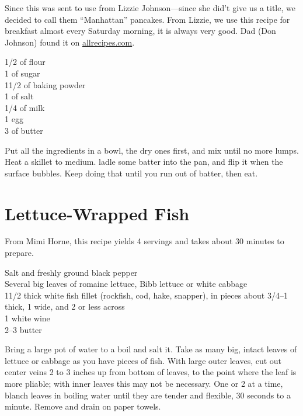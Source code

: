 \begin{open}
    Since this was sent to use from Lizzie Johnson---since she did't give us a title, we decided to call them ``Manhattan'' pancakes.  From Lizzie, we use this recipe for breakfast almost every Saturday morning, it is always very good. Dad (Don Johnson) found it on \url{allrecipes.com}.
\end{open}
\begin{ingredients}
    \SI{1/2}{\cup} of flour\\
    \SI{1}{\tblspoon} of sugar\\
    1\SI{1/2}{\teaspoon} of baking powder\\
    \SI{1}{\teaspoon} of salt\\
    \SI{1/4}{\cup} of milk\\
    1 egg\\
    \SI{3}{\tblspoon} of butter\\
\end{ingredients}
Put all the ingredients in a bowl, the dry ones first, and mix until no more
lumps. Heat a skillet to medium. ladle some batter into the pan, and flip it
when the surface bubbles. Keep doing that until you run out of batter, then eat.

\section{Lettuce-Wrapped Fish}

\begin{open}
    From Mimi Horne, this recipe yields 4 servings and takes about 30 minutes to prepare.
\end{open}
\begin{ingredients}
    Salt and freshly ground black pepper\\
    Several big leaves of romaine lettuce, Bibb lettuce or white cabbage\\
    1\SI{1/2}{\pound} thick white fish fillet (rockfish, cod, hake, snapper), in
    pieces about \SIrange[range-phrase={ to }]{3/4}{1}{\inch} thick,
    \SI{1}{\inch} wide, and \SI{2}{\inch} or less across\\
    \SI{1}{\cup} white wine\\
    \SIrange[range-phrase={ to }]{2}{3}{\tblspoon} butter\\
\end{ingredients}
Bring a large pot of water to a boil and salt it. Take as many big, intact
leaves of lettuce or cabbage as you have pieces of fish. With large outer
leaves, cut out center veins 2 to 3 inches up from bottom of leaves, to the
point where the leaf is more pliable; with inner leaves this may not be
necessary. One or 2 at a time, blanch leaves in boiling water until they are
tender and flexible, 30 seconds to a minute. Remove and drain on paper towels.


